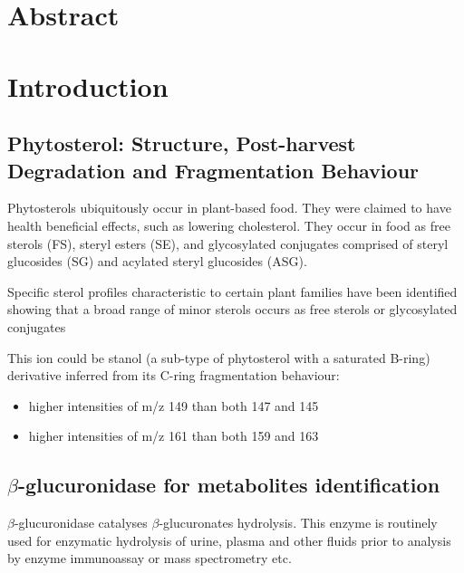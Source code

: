 \section{Abstract}

\section{Introduction}
\subsection{Phytosterol: Structure, Post-harvest Degradation and Fragmentation Behaviour}
Phytosterols ubiquitously occur in plant-based food\cite{sterolmsms}. They were claimed to have health beneficial effects, such as lowering cholesterol. They occur in food as free sterols (FS), steryl esters (SE), and glycosylated conjugates comprised of steryl glucosides (SG) and acylated steryl glucosides (ASG).

Specific sterol profiles characteristic to certain plant families have been identified showing that a broad range of minor sterols occurs as free sterols or glycosylated conjugates

This ion could be stanol (a sub-type of phytosterol with a saturated B-ring) derivative inferred from its C-ring fragmentation behaviour: 
\begin{itemize}
	\item higher intensities of m/z 149 than both 147 and 145
	\item higher intensities of m/z 161 than both 159 and 163
\end{itemize}
 

\subsection{$\beta$-glucuronidase for metabolites identification}

$\beta$-glucuronidase catalyses $\beta$-glucuronates hydrolysis. This enzyme is routinely used for enzymatic hydrolysis of urine, plasma and other fluids prior to analysis by enzyme immunoassay or mass spectrometry etc.

